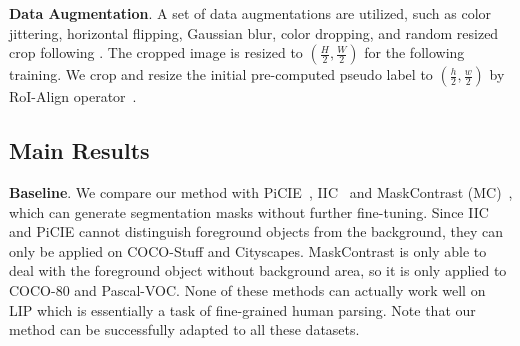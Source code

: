 \documentclass[runningheads]{llncs}
\newcommand{\PAR}[1]{\smallskip \noindent \textbf{#1}}
\begin{document}
\PAR{Data Augmentation}. A set of data augmentations are utilized, such as color jittering, horizontal flipping, Gaussian blur, color dropping, and random resized crop following \cite{BYOL,DINO}. The cropped image is resized to $(\frac{H}{2}, \frac{W}{2})$ for the following training. We crop and resize the initial pre-computed pseudo label to $(\frac{h}{2}, \frac{w}{2})$ by RoI-Align operator~\cite{he2017maskrcnn}.



\subsection{Main Results}
\PAR{Baseline}. We compare our method with PiCIE~\cite{PiCIE}, IIC~\cite{IIC} and MaskContrast (MC)~\cite{MaskContrast}, which can generate segmentation masks without further fine-tuning. Since IIC and PiCIE cannot distinguish foreground objects from the background, they can only be applied on COCO-Stuff and Cityscapes. MaskContrast is only able to deal with the foreground object without background area, so it is only applied to COCO-80 and Pascal-VOC. None of these methods can actually work well on LIP which is essentially a task of fine-grained human parsing. Note that our method can be successfully adapted to all these datasets.
\end{document}

